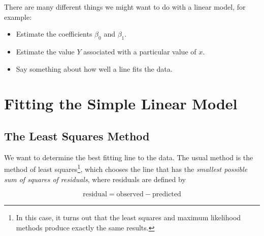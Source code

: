 \documentclass[twoside]{book}\usepackage[]{graphicx}\usepackage[]{xcolor}
\newcounter{example}[section]
\begin{document}
There are many different things we might want to do with a linear model, for example:
\begin{itemize}
	\item Estimate the coefficients $\beta_0$ and $\beta_1$.
	\item Estimate the value $Y$ associated with a particular value of $x$.
	\item Say something about how well a line fits the data.
\end{itemize}

\section{Fitting the Simple Linear Model}

\subsection{The Least Squares Method}

We want to determine the best fitting line to the data.  The usual method is 
the method of least squares\footnote{In this case, it turns out that the least 
squares and maximum likelihood methods produce exactly the same results.},
which chooses the line that has the 
\emph{ smallest possible sum of squares of residuals}, where residuals are defined by

\[
\mbox{residual} = \mbox{observed} - \mbox{predicted}
\]
\end{document}
